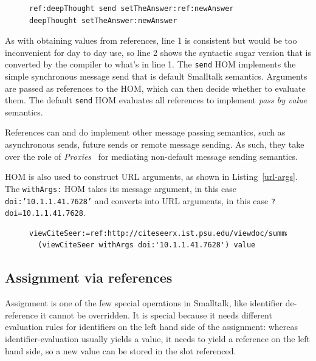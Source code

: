 \documentclass[preprint]{sigplanconf}
\begin{document}
\begin{figure}[htbp]
\begin{lstlisting}[style=numbers,label=message-via-ref,caption=Message sending via reference and with syntactic sugar]
ref:deepThought send setTheAnswer:ref:newAnswer
deepThought setTheAnswer:newAnswer
\end{lstlisting}
\end{figure}

As with obtaining values from references, line 1 is consistent but would be too inconvenient for day to day use,
so line 2 shows the syntactic sugar version that is converted by the compiler to what's in line 1.  The {\tt send}
HOM implements the simple synchronous message send that is default Smalltalk semantics.   Arguments
are passed as references to the HOM, which can then decide whether to evaluate them.  The default {\tt send}
HOM evaluates all references to implement \emph{pass by value} semantics.

References can and do implement other message passing semantics, such as asynchronous sends, future
sends or remote message sending.  As such, they take over the role of \emph{Proxies}~\cite{VanCutsemMiller} for mediating non-default
message sending semantics.  


HOM is also used to construct URL arguments, as shown in Listing~\ref{url-args}.  The {\tt withArgs:}
HOM takes its message argument, in this case {\tt doi:'10.1.1.41.7628'} and converts into URL arguments,
in this case {\tt ?doi=10.1.1.41.7628}.

\begin{figure}[htbp]
\begin{lstlisting}[style=numbers,label=url-args,caption=URL arguments via reference and higher order message.]
  viewCiteSeer:=ref:http://citeseerx.ist.psu.edu/viewdoc/summary.
  (viewCiteSeer withArgs doi:'10.1.1.41.7628') value
\end{lstlisting}
\end{figure}


\subsection{Assignment via references}

Assignment is one of the few special operations in Smalltalk, like identifier de-reference it cannot be overridden.
It is special because it needs different evaluation rules for identifiers on the left hand side of the assignment:
whereas identifier-evaluation usually yields a value, it needs to yield a reference on the left hand side, so
a new value can be stored in the slot referenced.
\end{document}
